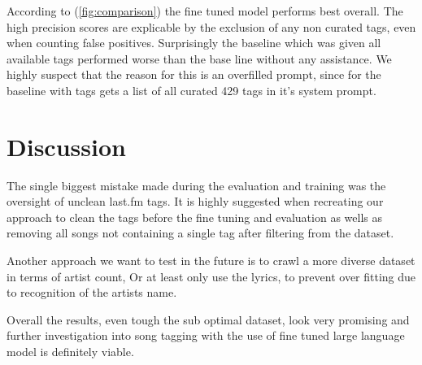 \documentclass[a4paper,12pt]{scrartcl}
\begin{document}
\begin{multicols}{2}
According to (\autoref{fig:comparison}) the fine tuned model performs best overall. The high precision scores are explicable by the exclusion of any non curated tags, even when counting false positives. Surprisingly the baseline which was given all available tags performed worse than the base line without any assistance. We highly suspect that the reason for this is an overfilled prompt, since for the baseline with tags gets a list of all curated 429 tags in it's system prompt.

\section{Discussion}

The single biggest mistake made during the evaluation and training was the oversight of unclean last.fm tags. It is highly suggested when recreating our approach to clean the tags before the fine tuning and evaluation as wells as removing all songs not containing a single tag after filtering from the dataset.

Another approach we want to test in the future is to crawl a more diverse dataset in terms of artist count, Or at least only use the lyrics, to prevent over fitting due to recognition of the artists name.

Overall the results, even tough the sub optimal dataset, look very promising and further investigation into song tagging with the use of fine tuned large language model is definitely viable.

\end{multicols}
\pagebreak

\end{document}
